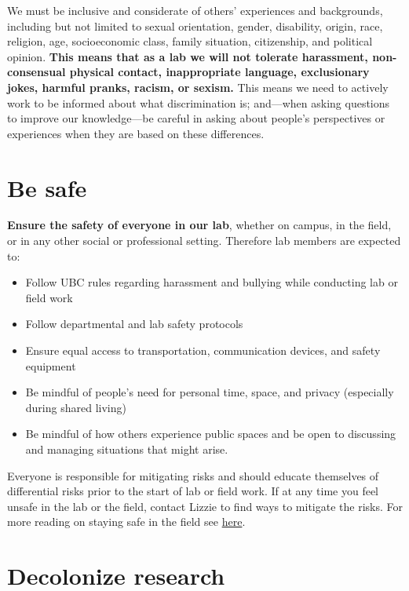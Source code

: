 \documentclass[11pt,a4paper,oneside]{article}
\begin{document}
We must be inclusive and considerate of others’ experiences and backgrounds, including but not limited to sexual orientation, gender, disability, origin, race, religion, age, socioeconomic class, family situation, citizenship, and political opinion. \textbf{This means that as a lab we will not tolerate harassment, non-consensual physical contact, inappropriate language, exclusionary jokes, harmful pranks, racism, or sexism.} This means we need to actively work to be informed about what discrimination is; and---when asking questions to improve our knowledge---be careful in asking about people's perspectives or experiences when they are based on these differences. 



\section{Be safe}

\textbf{Ensure the safety of everyone in our lab}, whether on campus, in the field, or in any other social or professional setting. Therefore lab members are expected to:
\begin{itemize}
  \item Follow UBC rules regarding harassment and bullying while conducting lab or field work
  \item Follow departmental and lab safety protocols 
  \item Ensure equal access to transportation, communication devices, and safety equipment 
  \item Be mindful of people’s need for personal time, space, and privacy (especially during shared living)
  \item Be mindful of how others experience public spaces and be open to discussing and managing situations that might arise.
\end{itemize}
  
\noindent
Everyone is responsible for mitigating risks and should educate themselves of differential risks prior to the start of lab or field work. If at any time you feel unsafe in the lab or the field, contact Lizzie to find ways to mitigate the risks. For more reading on staying safe in the field see \href{https://www.nature.com/articles/s41559-020-01328-5}{here}.

\section{Decolonize research}
\end{document}
